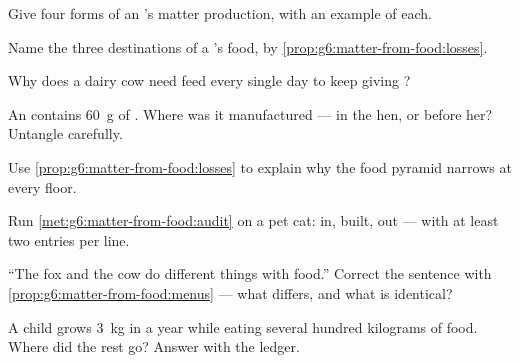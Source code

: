 \begin{exercise}[$\star$]\label{exo:g6:matter-from-food:3}
Give four forms of an 's matter production, with an
example of each.
\end{exercise}

\begin{exercise}[$\star$]\label{exo:g6:matter-from-food:4}
Name the three destinations of a 's food, by
\cref{prop:g6:matter-from-food:losses}.
\end{exercise}

\begin{exercise}[$\star$]\label{exo:g6:matter-from-food:5}
Why does a dairy cow need feed every single day to keep
giving ?
\end{exercise}

\begin{exercise}[$\star$]\label{exo:g6:matter-from-food:6}
An  contains \qty{60}{g} of . Where was it
manufactured --- in the hen, or before her? Untangle
carefully.
\end{exercise}

\begin{exercise}[$\star\star$]\label{exo:g6:matter-from-food:7}
Use \cref{prop:g6:matter-from-food:losses} to explain why
the food pyramid narrows at every floor.
\end{exercise}

\begin{exercise}[$\star\star$]\label{exo:g6:matter-from-food:8}
Run \cref{met:g6:matter-from-food:audit} on a pet cat: in,
built, out --- with at least two entries per line.
\end{exercise}

\begin{exercise}[$\star\star$]\label{exo:g6:matter-from-food:9}
``The fox and the cow do different things with food.''
Correct the sentence with
\cref{prop:g6:matter-from-food:menus} --- what differs, and
what is identical?
\end{exercise}

\begin{exercise}[$\star\star$]\label{exo:g6:matter-from-food:10}
A child grows \qty{3}{kg} in a year while eating several
hundred kilograms of food. Where did the rest go? Answer
with the ledger.
\end{exercise}


